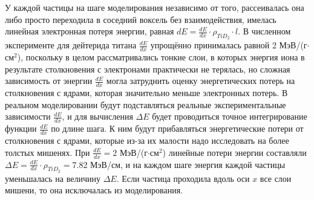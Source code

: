 \documentclass[a4paper,12pt]{article}
\begin{document}
\begin{large}
  У каждой частицы на шаге моделирования независимо от того, рассеивалась она либо просто переходила в соседний воксель без взаимодействия, имелась линейная электронная потеря энергии, равная $dE=\frac{dE}{dx} \cdot \rho_{TiD_2} \cdot l$.
  В численном эксперименте для дейтерида титана $\frac{dE}{dx}$ упрощённо принималась равной 2 МэВ/(г$\cdot$см$^2$), поскольку в целом рассматривались тонкие слои, в которых энергия иона в результате столкновения с электронами практически не терялась, но сложная зависимость от энергии $\frac{dE}{dx}$ могла затруднить оценку энергетических потерь на столкновения с ядрами, которая значительно меньше электронных потерь.
  В реальном моделировании будут подставляться реальные экспериментальные зависимости $\frac{dE}{dx}$, и для вычисления $\Delta E$ будет проводиться точное интегрирование функции $\frac{dE}{dx}$ по длине шага.
  К ним будут прибавляться энергетические потери от столкновения с ядрами, которые из-за их малости надо исследовать на более толстых мишенях.
  При $\frac{dE}{dx}=2$ МэВ/(г$\cdot$см$^2$) линейные потери энергии составляли $\Delta E=\frac{dE}{dx} \cdot \rho_{TiD_2}=$7.82 МэВ/см, и на каждом шаге энергия каждой частицы уменьшалась на величину $\Delta E$.
  Если частица проходила вдоль оси $x$ все слои мишени, то она исключалась из моделирования.



	
	
	
	
	
	
	
	
	
  
  
  

\end{large}
\end{document}
